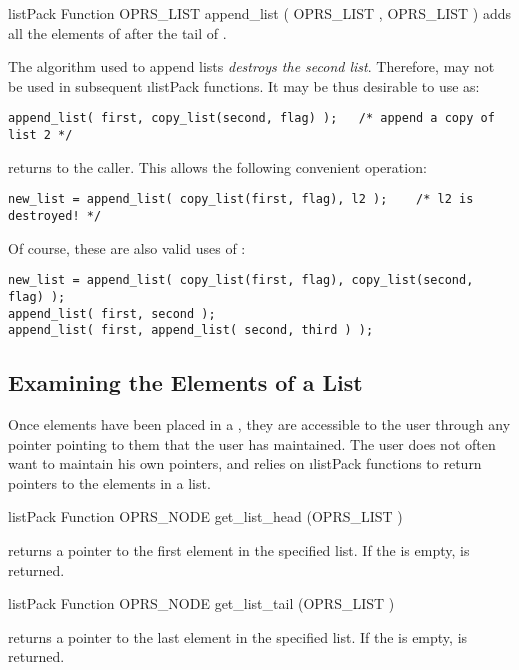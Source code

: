 \begin{typefn}{listPack Function} {OPRS\_LIST} {append\_list} {( OPRS\_LIST ,
OPRS\_LIST )}
 adds all the elements of 
after the tail of .

The algorithm used to append lists \emph{destroys the second list}.
Therefore,  may not be used in subsequent
\i{listPack} functions. It may be thus desirable to use
 as:
\begin{verbatim}
append_list( first, copy_list(second, flag) );   /* append a copy of list 2 */
\end{verbatim}
 returns  to the caller.
This allows the following convenient operation:
\begin{verbatim}
new_list = append_list( copy_list(first, flag), l2 );    /* l2 is destroyed! */
\end{verbatim}
Of course, these are also valid uses of :
\begin{verbatim}
new_list = append_list( copy_list(first, flag), copy_list(second, flag) );
append_list( first, second );
append_list( first, append_list( second, third ) );
\end{verbatim}
\end{typefn}

\subsection{Examining the Elements of a List}

Once elements have been placed in a , they are accessible to the
user through any pointer pointing to them that the user has maintained. The
user does not often want to maintain his own pointers, and relies on
\i{listPack} functions to return pointers to the elements in a list.

\begin{typefn}{listPack Function} {OPRS\_NODE} {get\_list\_head} {(OPRS\_LIST )}

 returns a pointer to the first element in the
specified list.  If the  is empty,  is returned.
\end{typefn}

\begin{typefn}{listPack Function} {OPRS\_NODE} {get\_list\_tail} {(OPRS\_LIST )}

 returns a pointer to the last element in the
specified list.  If the  is empty,  is returned.
\end{typefn}

